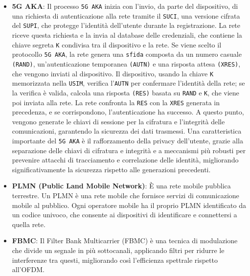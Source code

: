 \documentclass[english]{article}
\begin{document}
\begin{itemize}
	\item \textbf{\hypertarget{5G AKA}{5G AKA}}: Il processo \texttt{5G AKA} inizia con l'invio,
	      da parte del dispositivo, di una richiesta di autenticazione alla rete tramite il \texttt{SUCI},
	      una versione cifrata del \texttt{SUPI}, che protegge l'identità dell'utente durante la registrazione.
	      La rete riceve questa richiesta e la invia al database delle credenziali,
	      che contiene la chiave segreta \texttt{K} condivisa tra il dispositivo e la rete.
	      Se viene scelto il protocollo \texttt{5G AKA}, la rete genera una \texttt{sfida}
	      composta da un numero casuale \texttt{(RAND)}, un'autenticazione temporanea \texttt{(AUTN)}
	      e una risposta attesa \texttt{(XRES)}, che vengono inviati al dispositivo.
	      Il dispositivo, usando la chiave \texttt{K} memorizzata nella \texttt{USIM},
	      verifica l'\texttt{AUTN} per confermare l'identità della rete;
	      se la verifica è valida, calcola una risposta \texttt{(RES)} basata su \texttt{RAND} e \texttt{K},
	      che viene poi inviata alla rete. La rete confronta la \texttt{RES} con la \texttt{XRES} generata in precedenza,
	      e se corrispondono, l'autenticazione ha successo.\@
	      A questo punto, vengono generate le chiavi di sessione per la cifratura
	      e l'integrità delle comunicazioni, garantendo la sicurezza dei dati trasmessi.
	      Una caratteristica importante del \texttt{5G AKA} è il rafforzamento della privacy dell'utente,
	      grazie alla separazione delle chiavi di cifratura e integrità e a meccanismi più robusti
	      per prevenire attacchi di tracciamento e correlazione delle identità,
	      migliorando significativamente la sicurezza rispetto alle generazioni precedenti.\@

	\item \textbf{\hypertarget{PLMN}{PLMN (Public Land Mobile Network)}}:
	      È una rete mobile pubblica terrestre. Un PLMN è una rete mobile che fornisce servizi di
	      comunicazione mobile al pubblico. Ogni operatore mobile ha il proprio PLMN identificato
	      da un codice univoco, che consente ai dispositivi di identificare e connettersi a quella rete.

	\item \textbf{FBMC}\hypertarget{FBMC}{}: Il Filter Bank Multicarrier (FBMC) è una tecnica di
	      modulazione che divide un segnale in più sottocanali, applicando filtri per ridurre
	      le interferenze tra questi, migliorando così l'efficienza spettrale rispetto all'OFDM.\@


\end{itemize}
\end{document}
